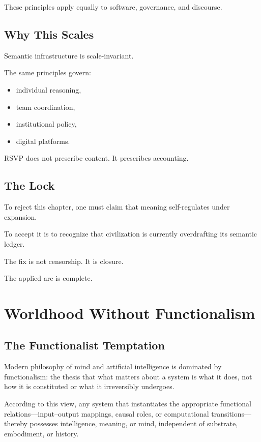 \documentclass[11pt]{book}
\begin{document}
These principles apply equally to software, governance, and discourse.

\section{Why This Scales}

Semantic infrastructure is scale-invariant.

The same principles govern:
\begin{itemize}
\item individual reasoning,
\item team coordination,
\item institutional policy,
\item digital platforms.
\end{itemize}

RSVP does not prescribe content.
It prescribes accounting.

\section{The Lock}

To reject this chapter, one must claim that meaning self-regulates under
expansion.

To accept it is to recognize that civilization is currently overdrafting its
semantic ledger.

The fix is not censorship.
It is closure.

The applied arc is complete.


\chapter{Worldhood Without Functionalism}
\label{ch:worldhood}

\section{The Functionalist Temptation}

Modern philosophy of mind and artificial intelligence is dominated by
functionalism: the thesis that what matters about a system is what it does, not
how it is constituted or what it irreversibly undergoes.

According to this view, any system that instantiates the appropriate functional
relations—input--output mappings, causal roles, or computational transitions—thereby
possesses intelligence, meaning, or mind, independent of substrate, embodiment,
or history.
\end{document}
